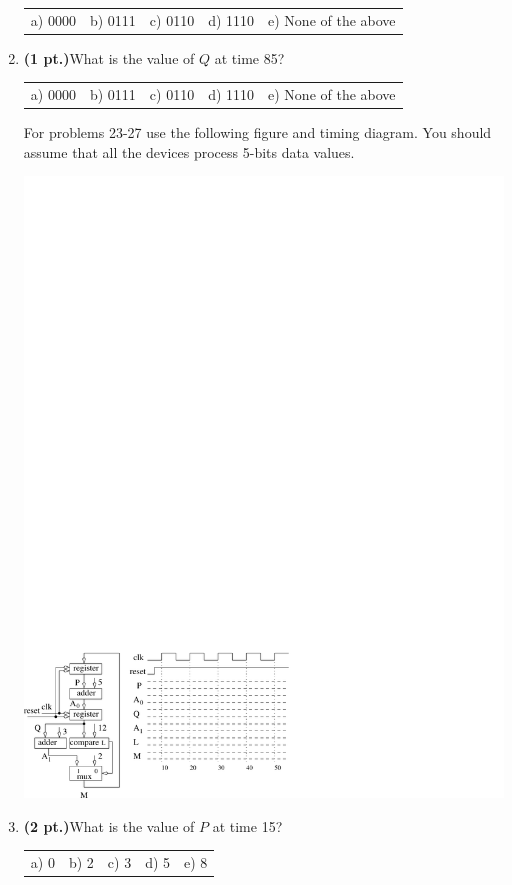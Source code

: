 \documentclass{article}
\begin{document}
\begin{enumerate}
\begin{tabular}{p{0.6in} p{0.6in} p{0.6in} p{0.6in} l}
a) 0000 & b) 0111 & c) 0110 & d) 1110 & e) None of the above
\end{tabular}

\item {\bf (1 pt.)}What is the value of $Q$ at time 85?

\begin{tabular}{p{0.6in} p{0.6in} p{0.6in} p{0.6in} l}
a) 0000 & b) 0111 & c) 0110 & d) 1110 & e) None of the above
\end{tabular}

\pagebreak
For problems 23-27 use the following figure and timing diagram.
You should assume that all the devices process 5-bits data 
values.

\includegraphics{./Fig2/BBBtiming2}

\item {\bf (2 pt.)}What is the value of $P$ at time 15?

\begin{tabular}{p{0.6in} p{0.6in} p{0.6in} p{0.6in} l}
a) 0 & b) 2 & c) 3 & d) 5 & e) 8
\end{tabular}


\end{enumerate}
\end{document}
